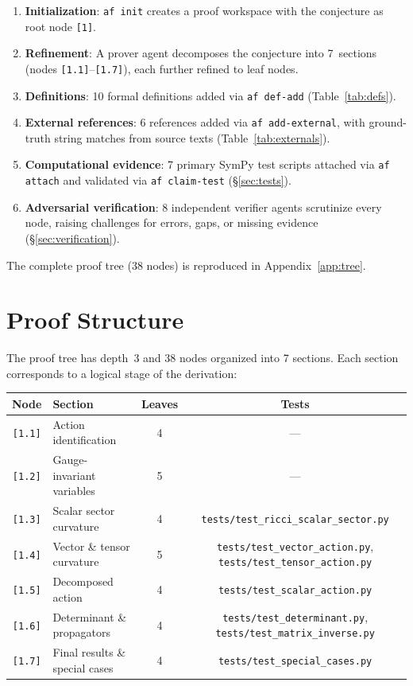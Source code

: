 \documentclass[11pt,a4paper]{article}
\newcommand{\afnode}[1]{\texttt{[#1]}}
\newcommand{\aftest}[1]{\texttt{tests/#1}}
\begin{document}
\begin{enumerate}
\item \textbf{Initialization}: \texttt{af init} creates a proof workspace with
  the conjecture as root node \afnode{1}.
\item \textbf{Refinement}: A prover agent decomposes the conjecture into 7~sections
  (nodes \afnode{1.1}--\afnode{1.7}), each further refined to leaf nodes.
\item \textbf{Definitions}: 10 formal definitions added via \texttt{af def-add}
  (Table~\ref{tab:defs}).
\item \textbf{External references}: 6 references added via \texttt{af add-external},
  with ground-truth string matches from source texts (Table~\ref{tab:externals}).
\item \textbf{Computational evidence}: 7 primary SymPy test scripts attached
  via \texttt{af attach} and validated via \texttt{af claim-test} (\S\ref{sec:tests}).
\item \textbf{Adversarial verification}: 8 independent verifier agents scrutinize
  every node, raising challenges for errors, gaps, or missing evidence (\S\ref{sec:verification}).
\end{enumerate}

The complete proof tree (38 nodes) is reproduced in Appendix~\ref{app:tree}.

\section{Proof Structure}
\label{sec:structure}

The proof tree has depth~3 and 38 nodes organized into 7 sections.
Each section corresponds to a logical stage of the derivation:

\begin{center}
\begin{tabular}{clcc}
\toprule
\textbf{Node} & \textbf{Section} & \textbf{Leaves} & \textbf{Tests} \\
\midrule
\afnode{1.1} & Action identification & 4 & --- \\
\afnode{1.2} & Gauge-invariant variables & 5 & --- \\
\afnode{1.3} & Scalar sector curvature & 4 & \aftest{test\_ricci\_scalar\_sector.py} \\
\afnode{1.4} & Vector \& tensor curvature & 5 & \aftest{test\_vector\_action.py}, \aftest{test\_tensor\_action.py} \\
\afnode{1.5} & Decomposed action & 4 & \aftest{test\_scalar\_action.py} \\
\afnode{1.6} & Determinant \& propagators & 4 & \aftest{test\_determinant.py}, \aftest{test\_matrix\_inverse.py} \\
\afnode{1.7} & Final results \& special cases & 4 & \aftest{test\_special\_cases.py} \\
\bottomrule
\end{tabular}
\end{center}
\end{document}
